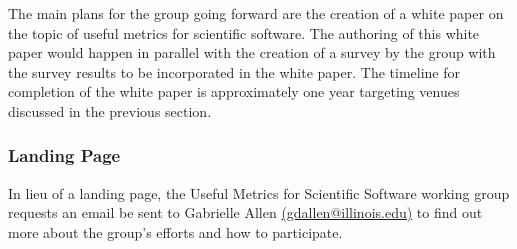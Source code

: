 The main plans for the group going forward are the creation of a white paper on
the topic of useful metrics for scientific software. The authoring of this white
paper would happen in parallel with the creation of a survey by the group with
the survey results to be incorporated in the white paper. The timeline for
completion of the white paper is approximately one year targeting venues
discussed in the previous section.

\subsubsection{Landing Page}

In lieu of a landing page, the Useful Metrics for Scientific Software working
group requests an email be sent to Gabrielle Allen
\href{mailto:gdallen@illinois.edu}{(gdallen@illinois.edu)} to find out more
about the group's efforts and how to participate.
